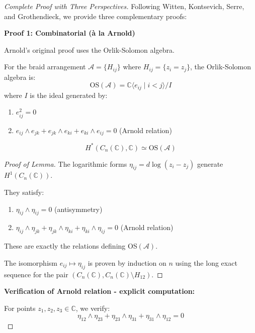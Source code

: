 \begin{proof}[Complete Proof with Three Perspectives]

Following Witten, Kontsevich, Serre, and Grothendieck, we provide three 
complementary proofs:

\textbf{Proof 1: Combinatorial (à la Arnold)}

Arnold's original proof \cite{Arnold69} uses the Orlik-Solomon algebra.

\begin{definition}\label{def:orlik-solomon-arnold}
For the braid arrangement $\mathcal{A} = \{H_{ij}\}$ where $H_{ij} = \{z_i = z_j\}$, 
the Orlik-Solomon algebra is:
$$\text{OS}(\mathcal{A}) = \mathbb{C}\langle e_{ij} \mid i < j \rangle / I$$
where $I$ is the ideal generated by:
\begin{enumerate}
\item $e_{ij}^2 = 0$
\item $e_{ij} \wedge e_{jk} + e_{jk} \wedge e_{ki} + e_{ki} \wedge e_{ij} = 0$ (Arnold relation)
\end{enumerate}
\end{definition}

\begin{lemma}\label{lem:OS-cohomology-arnold}
$$H^*(C_n(\mathbb{C}), \mathbb{C}) \simeq \text{OS}(\mathcal{A})$$
\end{lemma}

\begin{proof}[Proof of Lemma]
The logarithmic forms $\eta_{ij} = d\log(z_i - z_j)$ generate $H^1(C_n(\mathbb{C}))$.

They satisfy:
\begin{enumerate}
\item $\eta_{ij} \wedge \eta_{ij} = 0$ (antisymmetry)
\item $\eta_{ij} \wedge \eta_{jk} + \eta_{jk} \wedge \eta_{ki} + \eta_{ki} \wedge \eta_{ij} = 0$ 
(Arnold relation)
\end{enumerate}

These are exactly the relations defining OS$(\mathcal{A})$.

The isomorphism $e_{ij} \mapsto \eta_{ij}$ is proven by induction on $n$ using the 
long exact sequence for the pair $(C_n(\mathbb{C}), C_n(\mathbb{C}) \setminus H_{12})$.
\end{proof}

\textbf{Verification of Arnold relation - explicit computation:}

For points $z_1, z_2, z_3 \in \mathbb{C}$, we verify:
$$\eta_{12} \wedge \eta_{23} + \eta_{23} \wedge \eta_{31} + \eta_{31} \wedge \eta_{12} = 0$$


\end{proof}
